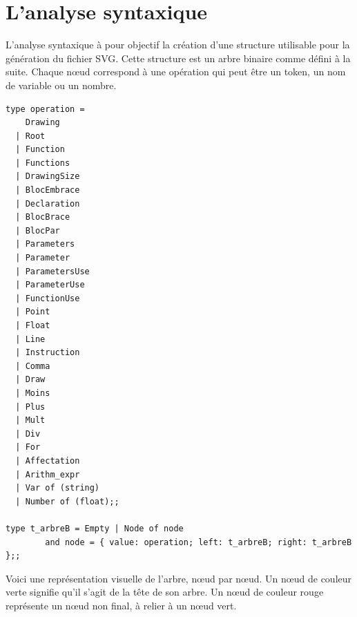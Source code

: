 \documentclass[11pt]{report} %
\begin{document}
\section{L'analyse syntaxique}
L'analyse syntaxique à pour objectif la création d'une structure utilisable pour la génération du fichier SVG. Cette structure est un arbre binaire comme défini à la suite. Chaque n{\oe}ud correspond à une opération qui peut être un token, un nom de variable ou un nombre.

\begin{lstlisting}[caption=Type arbre, language=caml]
type operation =
    Drawing
  | Root
  | Function
  | Functions
  | DrawingSize
  | BlocEmbrace
  | Declaration
  | BlocBrace
  | BlocPar
  | Parameters
  | Parameter
  | ParametersUse
  | ParameterUse
  | FunctionUse
  | Point
  | Float
  | Line
  | Instruction
  | Comma
  | Draw
  | Moins
  | Plus
  | Mult
  | Div
  | For
  | Affectation
  | Arithm_expr
  | Var of (string)
  | Number of (float);;
  
type t_arbreB = Empty | Node of node
        and node = { value: operation; left: t_arbreB; right: t_arbreB };;
\end{lstlisting}

Voici une représentation visuelle de l'arbre,  n{\oe}ud par  n{\oe}ud. Un n{\oe}ud de couleur verte signifie qu'il s'agit de la tête de son arbre. Un n{\oe}ud de couleur rouge représente un n{\oe}ud non final, à relier à un n{\oe}ud vert.
\end{document}
